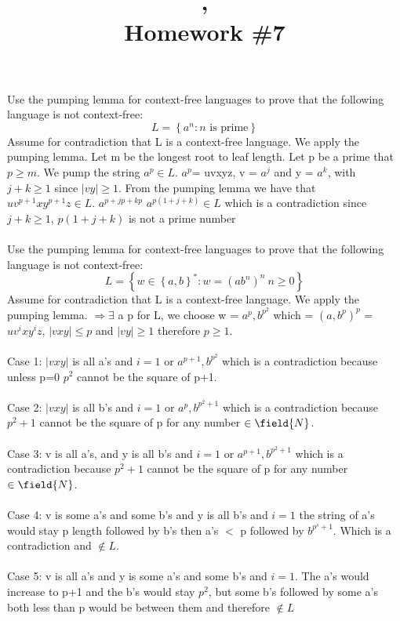 \documentclass{article}
\title{\course, \term\\Homework \#7}
\begin{document}
\maketitle

\question%
Use the pumping lemma for context-free languages to prove that the following
language is not context-free: 
\[L = \left\{a^n:\text{$n$ is prime} \right\}\]
\answer
Assume for contradiction that L is a context-free language. We apply the
pumping lemma. Let m be the longest root to leaf length. Let p be a prime
that $p\ge m$. We pump the string $a^p \in L$. $a^p$= uvxyz, v = $a^j$ and y = $a^k$, with 
$j + k \ge 1$ since $|vy|\ge 1 $. From the pumping lemma we have that $uv^{p+1}xy^{p+1}z \in L$. \rightarrow $a^{p+jp+kp}$ \rightarrow $a^{p(1+j+k)} \in L$ which is a contradiction since $j + k \ge 1$, $p(1+j+k)$ is not a prime number\\\\
\question%
Use the pumping lemma for context-free languages to prove that the following
language is not context-free: 
\[L = \left\{w\in \left\{a,b\right\}^* : w=\left(ab^n\right)^n \: n\geq 0
    \right\}\]
\answer
Assume for contradiction that L is a context-free language. We apply the
pumping lemma. $\Rightarrow\exists$ a p for L, we choose w = $a^p,b^{p}^2$ which
= $(a,b^p)^p$ = $uv^ixy^iz$, $|vxy|\le p$ and $|vy|\ge 1$ therefore $p \ge 1$.\\\\
Case 1: $|vxy|$ is all a's and $i=1$ or $a^{p+1},b^{p}^2$ which is a contradiction
because unless p=0 $p^2$ cannot be the square of p+1.\\\\
Case 2: $|vxy|$ is all b's and $i=1$ or $a^p,b^{p^2+1}$ which is a contradiction
because $p^2+1$ cannot be the square of p for any number $\in \field{N}$.\\\\
Case 3: v is all a's, and y is all b's and $i=1$ or $a^{p+1},b^{p^2+1}$ which is a contradiction
because $p^2+1$ cannot be the square of p for any number $\in \field{N}$.\\\\
Case 4: v is some a's and some b's and y is all b's and $i=1$ the string of a's would stay p length followed by b's then a's $<$ p followed by $b^{p^s+1}$. Which is a contradiction and $\notin L$.\\\\
Case 5: v is all a's and y is some a's and some b's and $i=1$. The a's would increase to p+1 and the b's would stay $p^2$, but some b's followed by some a's both less than p would be between them and therefore $\notin L$ \\\\
\end{document}
